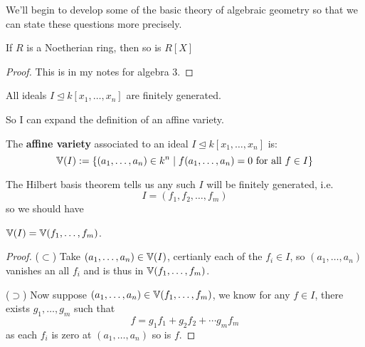 \documentclass{article}
\begin{document}
We'll begin to develop some of the basic theory of algebraic geometry so that we can state these questions more precisely.

\begin{theorem}
    If $R$ is a Noetherian ring, then so is $R[X]$
    \begin{proof}
        This is in my notes for algebra 3.
    \end{proof}
\end{theorem}

\begin{corollary}
    All ideals $I\unlhd k[x_1,\ldots,x_n]$ are finitely generated.
\end{corollary}

So I can expand the definition of an affine variety.

\begin{definition}
    The \textbf{affine variety} associated to an ideal $I\unlhd k[x_1,\ldots,x_n]$ is:\[
        \mathbb{V}(I) := \{(a_1,\ldots,a_n)\in k^n \mid f(a_1,\ldots,a_n)=0 \text{ for all } f\in I\}
    \]
\end{definition}

The Hilbert basis theorem tells us any such $I$ will be finitely generated, i.e.\[
    I = (f_1,f_2,\ldots,f_m)
\] so we should have

\begin{lemma}
    $\mathbb{V}(I) = \mathbb{V}(f_1,\ldots,f_m)$.
    \begin{proof}
        ($\subset$) Take $(a_1,\ldots,a_n)\in \mathbb{V}(I)$, certianly each of the $f_i\in I$, so $(a_1,\ldots,a_n)$ vanishes an all $f_i$ and is thus in $\mathbb{V}(f_1,\ldots,f_m)$.

        ($\supset$) Now suppose $(a_1,\ldots,a_n)\in\mathbb{V}(f_1,\ldots,f_m)$, we know for any $f\in I$, there exists $g_1,\ldots,g_m$ such that \[
            f = g_1f_1 + g_2f_2 + \cdots g_mf_m
        \] as each $f_i$ is zero at $(a_1,\ldots,a_n)$ so is $f$.
    \end{proof}
\end{lemma}
\end{document}
